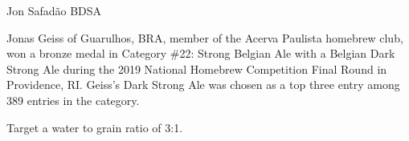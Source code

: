 \begin{recipe}{Jon Safadão BDSA}

\begin{aboutblock}
Jonas Geiss of Guarulhos, BRA, member of the Acerva Paulista homebrew club, won
a bronze medal in Category \#22: Strong Belgian Ale with a Belgian Dark Strong
Ale during the 2019 National Homebrew Competition Final Round in Providence, RI.
Geiss's Dark Strong Ale was chosen as a top three entry among 389 entries in the
category. \sourceaha
\end{aboutblock}


\begin{methodandtiming}
 
\begin{mashsteps}
\end{mashsteps}

\begin{fermentationsteps}
\end{fermentationsteps}

\begin{directions}
Target a water to grain ratio of 3:1.
\end{directions}

\end{methodandtiming}

\recipebreak

\begin{ingredientsblock}

\begin{malts}
\end{malts}

\begin{hops}
\end{hops}


\end{ingredientsblock}

\end{recipe}
